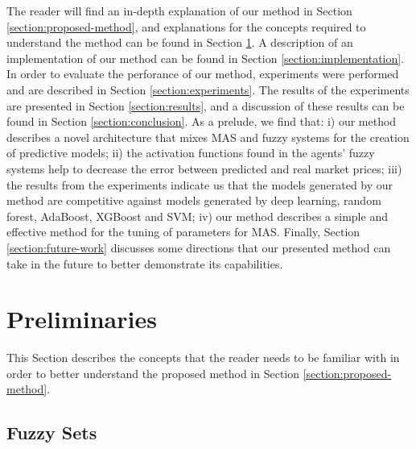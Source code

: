 ﻿\documentclass{ieeeaccess}
\begin{document}
The reader will find an in-depth explanation of our method in Section
\ref{section:proposed-method}, and explanations for the concepts
required to understand the method can be found in Section
\ref{section:preliminaries}. A description of an implementation of our method can be
found in Section \ref{section:implementation}. In order to evaluate
the perforance of our method, experiments were performed and are
described in Section \ref{section:experiments}. The results of the
experiments are presented in Section \ref{section:results}, and a
discussion of these results can be found in Section
\ref{section:conclusion}. As a prelude, we find that: i) our method
describes a novel architecture that mixes MAS and fuzzy systems for
the creation of predictive models; ii) the activation functions found
in the agents' fuzzy systems help to decrease the error between
predicted and real market prices; iii) the results from the
experiments indicate us that the models generated by our method are
competitive against models generated by deep learning, random forest,
AdaBoost, XGBoost and SVM; iv) our method
describes a simple and effective method for the tuning of parameters
for MAS. Finally, Section \ref{section:future-work}
discusses some directions that our presented method can take in the
future to better demonstrate its capabilities.

\section{Preliminaries}
\label{section:preliminaries}
%

This Section describes the concepts that the reader needs to be familiar with in
order to better understand the proposed method in Section
\ref{section:proposed-method}.%
\subsection{Fuzzy Sets}
\label{subsection:fuzzy-sets}
\end{document}
